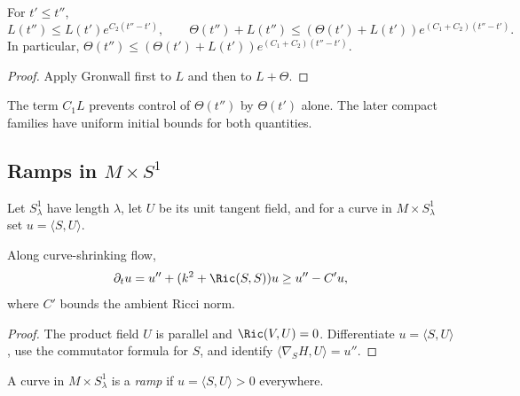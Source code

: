 \begin{corollary}
\label{cor:curve-shrinking-length-curvature-exponential-bound}
\label{lncurvgrowth}
For $t'\le t''$,
\[
L(t'')\le L(t')e^{C_2(t''-t')},
\qquad
\Theta(t'')+L(t'')\le(\Theta(t')+L(t'))e^{(C_1+C_2)(t''-t')}.
\]
In particular,
$\Theta(t'')\le(\Theta(t')+L(t'))e^{(C_1+C_2)(t''-t')}$.
\end{corollary}
\begin{proof}
\sketch Apply Gronwall first to $L$ and then to $L+\Theta$.
\end{proof}

\begin{remark}
\label{rem:total-curvature-needs-initial-length}
The term $C_1L$ prevents control of $\Theta(t'')$ by $\Theta(t')$ alone. The
later compact families have uniform initial bounds for both quantities.
\end{remark}

\subsection{Ramps in $M\times S^1$}

Let $S^1_\lambda$ have length $\lambda$, let $U$ be its unit tangent field,
and for a curve in $M\times S^1_\lambda$ set $u=\langle S,U\rangle$.

\begin{claim}
\label{claim:ramp-function-evolution}
\label{rampcomp}
Along curve-shrinking flow,
\[
\partial_tu=u''+(k^2+\Ric(S,S))u\ge u''-C'u,
\]
where $C'$ bounds the ambient Ricci norm.
\end{claim}
\begin{proof}
\sketch The product field $U$ is parallel and $\Ric(V,U)=0$. Differentiate
$u=\langle S,U\rangle$, use the commutator formula for $S$, and identify
$\langle\nabla_SH,U\rangle=u''$.
\end{proof}

\begin{definition}[Ramp]
\label{def:ramp-curve}
A curve in $M\times S^1_\lambda$ is a \emph{ramp} if
$u=\langle S,U\rangle>0$ everywhere.
\end{definition}

